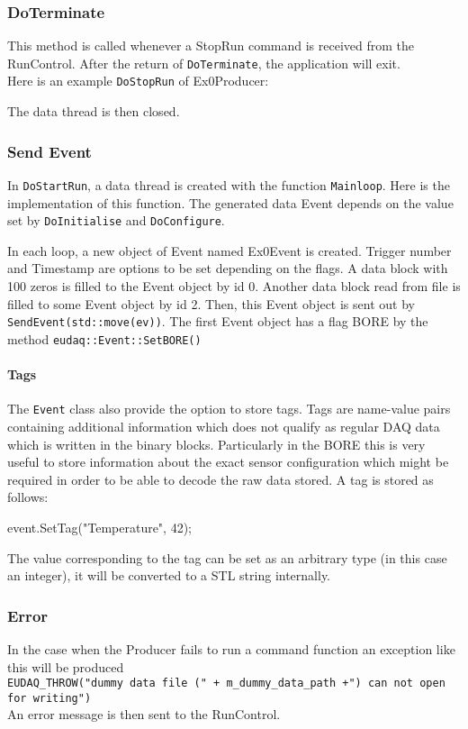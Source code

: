 \subsubsection{DoTerminate}
This method is called whenever a StopRun command is received from the RunControl. After the return of \lstinline[style=cpp]{DoTerminate}, the application will exit.\\
Here is an example \lstinline[style=cpp]{DoStopRun} of Ex0Producer:

The data thread is then closed. 

\subsubsection{Send Event}
In \lstinline[style=cpp]{DoStartRun}, a data thread is created with the function \lstinline[style=cpp]{Mainloop}. Here is the implementation of this function. The generated data Event depends on the value set by \lstinline[style=cpp]{DoInitialise} and \lstinline[style=cpp]{DoConfigure}.

In each loop, a new object of Event named Ex0Event is created. Trigger number and Timestamp are options to be set depending on the flags. A data block with 100 zeros is filled to the Event object by id 0. Another data block read from file is filled to some Event object by id 2. Then, this Event object is sent out by \lstinline[style=cpp]{SendEvent(std::move(ev))}. The first Event object has a flag BORE by the method \lstinline[style=cpp]{eudaq::Event::SetBORE()}

\paragraph{Tags}\label{sec:Tags}
The \texttt{Event} class also provide the option to store tags.
Tags are name-value pairs containing additional information which does not qualify as regular DAQ data which is written in the binary blocks.
Particularly in the \gls{BORE} this is very useful to store information about the exact sensor configuration which might be required in order to be able to decode the raw data stored.
A tag is stored as follows:
\begin{listing}
event.SetTag("Temperature", 42);
\end{listing}

The value corresponding to the tag can be set as an arbitrary type (in this case an integer),
it will be converted to a STL string internally.

\subsubsection{Error}\label{sec:Tags}
In the case when the Producer fails to run a command function an exception like this will be produced \\
\lstinline[style=cpp]{EUDAQ_THROW("dummy data file (" + m_dummy_data_path +") can not open for writing")}\\
An error message is then sent to the RunControl.


